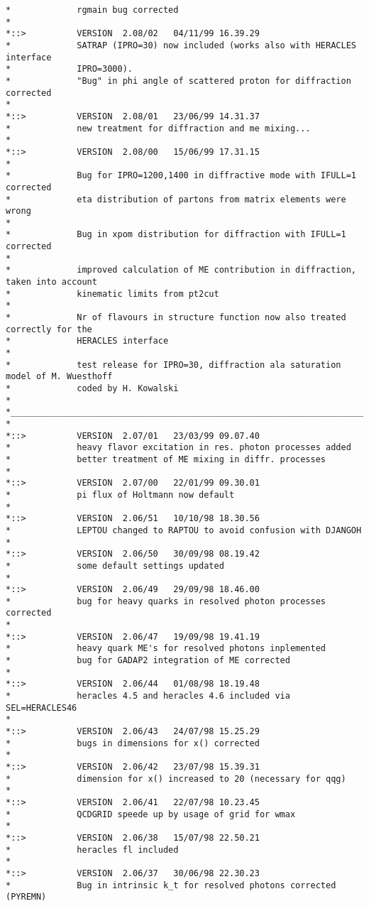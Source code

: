 \documentclass[10pt]{article} \usepackage{dina4}
\begin{document}
\begin{verbatim}
*             rgmain bug corrected
*
*::>          VERSION  2.08/02   04/11/99 16.39.29
*             SATRAP (IPRO=30) now included (works also with HERACLES interface
*             IPRO=3000).
*             "Bug" in phi angle of scattered proton for diffraction corrected
*
*::>          VERSION  2.08/01   23/06/99 14.31.37
*             new treatment for diffraction and me mixing...
*
*::>          VERSION  2.08/00   15/06/99 17.31.15
*
*             Bug for IPRO=1200,1400 in diffractive mode with IFULL=1 corrected
*             eta distribution of partons from matrix elements were wrong
*
*             Bug in xpom distribution for diffraction with IFULL=1 corrected
*
*             improved calculation of ME contribution in diffraction, taken into account
*             kinematic limits from pt2cut
*
*             Nr of flavours in structure function now also treated correctly for the
*             HERACLES interface
*
*             test release for IPRO=30, diffraction ala saturation model of M. Wuesthoff
*             coded by H. Kowalski
*
*________________________________________________________________________
*
*::>          VERSION  2.07/01   23/03/99 09.07.40
*             heavy flavor excitation in res. photon processes added
*             better treatment of ME mixing in diffr. processes
*
*::>          VERSION  2.07/00   22/01/99 09.30.01
*             pi flux of Holtmann now default
*
*::>          VERSION  2.06/51   10/10/98 18.30.56
*             LEPTOU changed to RAPTOU to avoid confusion with DJANGOH
*
*::>          VERSION  2.06/50   30/09/98 08.19.42
*             some default settings updated
*
*::>          VERSION  2.06/49   29/09/98 18.46.00
*             bug for heavy quarks in resolved photon processes corrected
*
*::>          VERSION  2.06/47   19/09/98 19.41.19
*             heavy quark ME's for resolved photons inplemented
*             bug for GADAP2 integration of ME corrected
*
*::>          VERSION  2.06/44   01/08/98 18.19.48
*             heracles 4.5 and heracles 4.6 included via SEL=HERACLES46
*
*::>          VERSION  2.06/43   24/07/98 15.25.29
*             bugs in dimensions for x() corrected
*
*::>          VERSION  2.06/42   23/07/98 15.39.31
*             dimension for x() increased to 20 (necessary for qqg)
*
*::>          VERSION  2.06/41   22/07/98 10.23.45
*             QCDGRID speede up by usage of grid for wmax
*
*::>          VERSION  2.06/38   15/07/98 22.50.21
*             heracles fl included
*
*::>          VERSION  2.06/37   30/06/98 22.30.23
*             Bug in intrinsic k_t for resolved photons corrected (PYREMN)

\end{verbatim}
\end{document}
